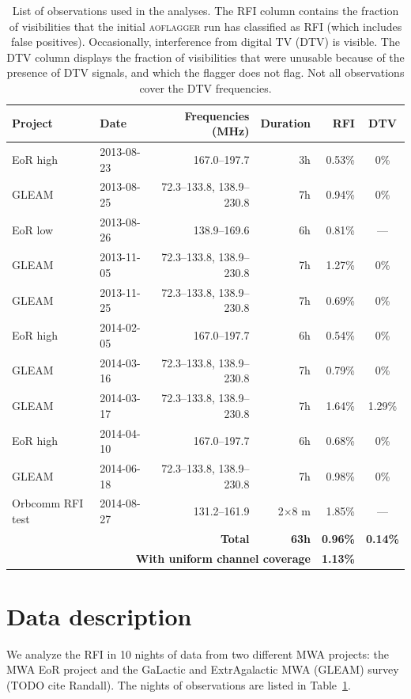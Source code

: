 \documentclass{pasa}
\begin{document}
\begin{table}
\caption{List of observations used in the analyses. The RFI column contains the fraction of visibilities that the initial \textsc{aoflagger} run has classified as RFI (which includes false positives). Occasionally, interference from digital TV (DTV) is visible. The DTV column displays the fraction of visibilities that were unusable because of the presence of DTV signals, and which the flagger does not flag. Not all observations cover the DTV frequencies.}\label{tbl:obs-list}
\begin{center}%
\begin{tabular}{|l|l|r|r|r|c|}
\hline
\textbf{Project} &\textbf{Date} & \textbf{Frequencies (MHz)} & \textbf{Duration} & RFI & DTV \\
\hline
EoR high& 2013-08-23 & 167.0--197.7              & 3h & 0.53\% & 0\% \\
GLEAM & 2013-08-25 & 72.3--133.8, 138.9--230.8 & 7h & 0.94\% & 0\% \\
EoR low& 2013-08-26 & 138.9--169.6              & 6h & 0.81\% & ---\\
GLEAM & 2013-11-05 & 72.3--133.8, 138.9--230.8 & 7h & 1.27\% & 0\% \\
GLEAM & 2013-11-25 & 72.3--133.8, 138.9--230.8 & 7h & 0.69\% & 0\% \\
EoR high& 2014-02-05 & 167.0--197.7              & 6h & 0.54\% & 0\%\\
GLEAM & 2014-03-16 & 72.3--133.8, 138.9--230.8 & 7h & 0.79\% & 0\% \\
GLEAM & 2014-03-17 & 72.3--133.8, 138.9--230.8 & 7h & 1.64\% & 1.29\% \\
EoR high& 2014-04-10 & 167.0--197.7              & 6h & 0.68\% & 0\%\\
GLEAM & 2014-06-18 & 72.3--133.8, 138.9--230.8 & 7h & 0.98\% & 0\% \\
Orbcomm RFI test&2014-08-27& 131.2--161.9     & 2$\times$8 m& 1.85\% & --- \\
\hline
\multicolumn{3}{|r|}{\textbf{Total}} & \textbf{63h} & \textbf{0.96\%} & \textbf{0.14\%}\\
\hline
\multicolumn{4}{|r|}{\textbf{With uniform channel coverage}} & \textbf{1.13\%} & \\
\hline
\end{tabular}
\end{center}
\end{table}

\section{Data description} \label{ch:data-description}
We analyze the RFI in 10 nights of data from two different MWA projects: the MWA EoR project \citep{bowman-science-with-the-mwa-2013} and the GaLactic and ExtrAgalactic MWA (GLEAM) survey (TODO cite Randall). The nights of observations are listed in Table~\ref{tbl:obs-list}.
\end{document}
